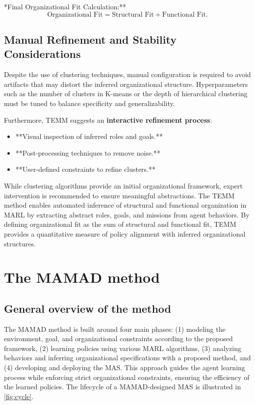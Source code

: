 \documentclass[journal]{IEEEtai}
\begin{document}
\noindent **Final Organizational Fit Calculation:**  
\begin{equation}
    \text{Organizational Fit} = \text{Structural Fit} + \text{Functional Fit}.
\end{equation}

\subsection{Manual Refinement and Stability Considerations}

Despite the use of clustering techniques, manual configuration is required to avoid artifacts that may distort the inferred organizational structure. Hyperparameters such as the number of clusters in K-means or the depth of hierarchical clustering must be tuned to balance specificity and generalizability.

Furthermore, TEMM suggests an \textbf{interactive refinement process}:
\begin{itemize}
    \item **Visual inspection of inferred roles and goals.**
    \item **Post-processing techniques to remove noise.**
    \item **User-defined constraints to refine clusters.**
\end{itemize}

While clustering algorithms provide an initial organizational framework, expert intervention is recommended to ensure meaningful abstractions. The TEMM method enables automated inference of structural and functional organization in MARL by extracting abstract roles, goals, and missions from agent behaviors. By defining organizational fit as the sum of structural and functional fit, TEMM provides a quantitative measure of policy alignment with inferred organizational structures.



\section{The MAMAD method}\label{sec:mamad}



\subsection{General overview of the method}

The MAMAD method is built around four main phases: (1) modeling the environment, goal, and organizational constraints according to the proposed framework, (2) learning policies using various MARL algorithms, (3) analyzing behaviors and inferring organizational specifications with a proposed method, and (4) developing and deploying the MAS. This approach guides the agent learning process while enforcing strict organizational constraints, ensuring the efficiency of the learned policies. The lifecycle of a MAMAD-designed MAS is illustrated in \autoref{fig:cycle}.
\end{document}
